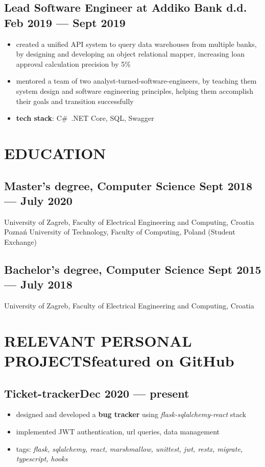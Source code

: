 \documentclass{article}
\begin{document}
\subsection{Lead Software Engineer at Addiko Bank d.d. \hfill Feb 2019 --- Sept 2019}
\begin{itemize}
  \itemsep0em
  \item created a unified API system to query data warehouses from multiple banks, by designing and developing an object relational mapper, increasing loan approval calculation precision by 5\%
  \item mentored a team of two analyst-turned-software-engineers, by teaching them system design and software engineering principles, helping them accomplish their goals and transition successfully
  \item {\bfseries tech stack}: C\#~.NET Core, SQL, Swagger
\end{itemize}

\section{EDUCATION}
\subsection{Master's degree, Computer Science \hfill Sept 2018 --- July 2020}
University of Zagreb, Faculty of Electrical Engineering and Computing, Croatia\\
Poznań University of Technology, Faculty of Computing, Poland (Student Exchange)

\subsection{Bachelor's degree, Computer Science \hfill Sept 2015 --- July 2018}
University of Zagreb, Faculty of Electrical Engineering and Computing, Croatia


\section{RELEVANT PERSONAL PROJECTS\hfill featured on GitHub}
\subsection{Ticket-tracker\hfill Dec 2020 --- present}
\begin{itemize}
  \itemsep0em
  \item designed and developed a {\bfseries bug tracker} using \textit{flask-sqlalchemy-react} stack
  \item implemented JWT authentication, url queries, data management
  \item tags: \textit{flask, sqlalchemy, react, marshmallow, unittest, jwt, restx, migrate, typescript, hooks}
\end{itemize}
\end{document}
